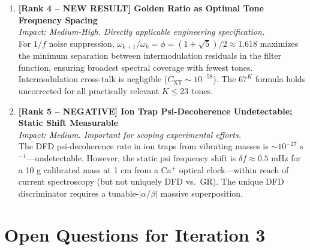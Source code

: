 \documentclass[11pt]{article}
\theoremstyle{definition}
\theoremstyle{remark}
\begin{document}
\begin{enumerate}
\item \textbf{[Rank 4 -- NEW RESULT] Golden Ratio as Optimal Tone Frequency
Spacing}\\
\textit{Impact: Medium-High. Directly applicable engineering specification.}\\
For $1/f$ noise suppression, $\omega_{k+1}/\omega_k = \phi = (1+\sqrt{5})/2 \approx
1.618$ maximizes the minimum separation between intermodulation residuals in the
filter function, ensuring broadest spectral coverage with fewest tones.
Intermodulation cross-talk is negligible ($C_{\mathrm{XT}} \sim 10^{-58}$).
The $67^K$ formula holds uncorrected for all practically relevant $K \leq 23$ tones.

\item \textbf{[Rank 5 -- NEGATIVE] Ion Trap Psi-Decoherence Undetectable;
Static Shift Measurable}\\
\textit{Impact: Medium. Important for scoping experimental efforts.}\\
The DFD psi-decoherence rate in ion traps from vibrating masses is
$\sim 10^{-27}$ s$^{-1}$---undetectable.  However, the static psi frequency
shift is $\delta f \approx 0.5$ mHz for a 10 g calibrated mass at 1 cm from
a Ca$^+$ optical clock---within reach of current spectroscopy (but not
uniquely DFD vs.\ GR).  The unique DFD discriminator requires a
tunable-$|\alpha/\beta|$ massive superposition.

\end{enumerate}

\section{Open Questions for Iteration 3}
\label{sec:open-questions}
\end{document}

